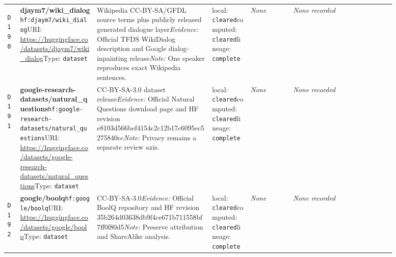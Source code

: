 \documentclass[9pt,a4paper]{article}
\newcommand{\depid}[1]{\hypertarget{dep:#1}{\texttt{#1}}}
\begin{document}
\begin{landscape}
\begin{longtable}{@{}L{0.035\linewidth}L{0.185\linewidth}L{0.27\linewidth}L{0.09\linewidth}L{0.10\linewidth}L{0.24\linewidth}@{}}
\depid{D190} & \textbf{djaym7/wiki\_dialog}\newline \nolinkurl{hf:djaym7/wiki_dialog}\newline URI: \url{https://huggingface.co/datasets/djaym7/wiki_dialog}\newline Type: \texttt{dataset} & Wikipedia CC-BY-SA/GFDL source terms plus publicly released generated dialogue layer\newline \textit{Evidence:} Official TFDS WikiDialog description and Google dialog-inpainting release\newline \textit{Note:} One speaker reproduces exact Wikipedia sentences. & local: \texttt{cleared}\newline computed: \texttt{cleared}\newline lineage: \texttt{complete} & \textit{None} & \textit{None recorded} \\
\depid{D191} & \textbf{google-research-datasets/natural\_questions}\newline \nolinkurl{hf:google-research-datasets/natural_questions}\newline URI: \url{https://huggingface.co/datasets/google-research-datasets/natural_questions}\newline Type: \texttt{dataset} & CC-BY-SA-3.0 dataset release\newline \textit{Evidence:} Official Natural Questions download page and HF revision e8103d566bef4154c2c12b17c6095ec5275840cc\newline \textit{Note:} Privacy remains a separate review axis. & local: \texttt{cleared}\newline computed: \texttt{cleared}\newline lineage: \texttt{complete} & \textit{None} & \textit{None recorded} \\
\depid{D192} & \textbf{google/boolq}\newline \nolinkurl{hf:google/boolq}\newline URI: \url{https://huggingface.co/datasets/google/boolq}\newline Type: \texttt{dataset} & CC-BY-SA-3.0\newline \textit{Evidence:} Official BoolQ repository and HF revision 35b264d03638db9f4ce671b711558bf7ff0f80d5\newline \textit{Note:} Preserve attribution and ShareAlike analysis. & local: \texttt{cleared}\newline computed: \texttt{cleared}\newline lineage: \texttt{complete} & \textit{None} & \textit{None recorded} \\

\end{longtable}
\end{landscape}
\end{document}
